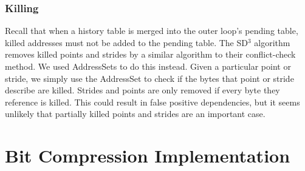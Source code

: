 \documentclass[12pt,twoside]{reedthesis}
\begin{document}
		\subsubsection{Killing}
		
			Recall that when a history table is merged into the outer loop's pending table, killed addresses must not be added to the pending table. 
			The SD$^3$ algorithm removes killed points and strides by a similar algorithm to their conflict-check method. We used AddressSets to do this instead. Given a particular point or stride, we simply use the AddressSet to check if the bytes that point or stride describe are killed. Strides and points are only removed if every byte they reference is killed. This could result in false positive dependencies, but it seems unlikely that partially killed points and strides are an important case. 
%			
%			
		
			
			
			
			
			
		
			
			
					
		\section{Bit Compression Implementation}
			
\end{document}
